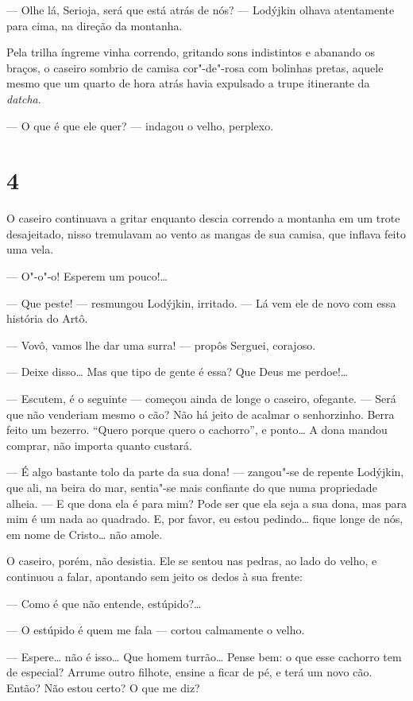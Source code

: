--- Olhe lá, Serioja, será que está atrás de nós? --- Lodýjkin olhava
atentamente para cima, na direção da montanha.

Pela trilha íngreme vinha correndo, gritando sons indistintos e abanando
os braços, o caseiro sombrio de camisa cor"-de"-rosa com bolinhas pretas,
aquele mesmo que um quarto de hora atrás havia expulsado a trupe
itinerante da \emph{datcha}.

--- O que é que ele quer? --- indagou o velho, perplexo.

\section{4}

O caseiro continuava a gritar enquanto descia correndo a montanha em um
trote desajeitado, nisso tremulavam ao vento as mangas de sua camisa,
que inflava feito uma vela.

--- O"-o"-o! Esperem um pouco!\ldots{}

--- Que peste! --- resmungou Lodýjkin, irritado. --- Lá vem ele de novo
com essa história do Artô.

--- Vovô, vamos lhe dar uma surra! --- propôs Serguei, corajoso.

--- Deixe disso\ldots{} Mas que tipo de gente é essa? Que Deus me perdoe!\ldots{}

--- Escutem, é o seguinte --- começou ainda de longe o caseiro,
ofegante. --- Será que não venderiam mesmo o cão? Não há jeito de
acalmar o senhorzinho. Berra feito um bezerro. ``Quero porque quero o
cachorro'', e ponto\ldots{} A dona mandou comprar, não importa quanto
custará.

--- É algo bastante tolo da parte da sua dona! --- zangou"-se de repente
Lodýjkin, que ali, na beira do mar, sentia"-se mais confiante do que numa
propriedade alheia. --- E que dona ela é para mim? Pode ser que ela seja
a sua dona, mas para mim é um nada ao quadrado. E, por favor, eu estou
pedindo\ldots{} fique longe de nós, em nome de Cristo\ldots{} não amole.

O caseiro, porém, não desistia. Ele se sentou nas pedras, ao lado do
velho, e continuou a falar, apontando sem jeito os dedos à sua frente:

--- Como é que não entende, estúpido?\ldots{}

--- O estúpido é quem me fala --- cortou calmamente o velho.

--- Espere\ldots{} não é isso\ldots{} Que homem turrão\ldots{} Pense bem: o que esse
cachorro tem de especial? Arrume outro filhote, ensine a ficar de pé, e
terá um novo cão. Então? Não estou certo? O que me diz?

